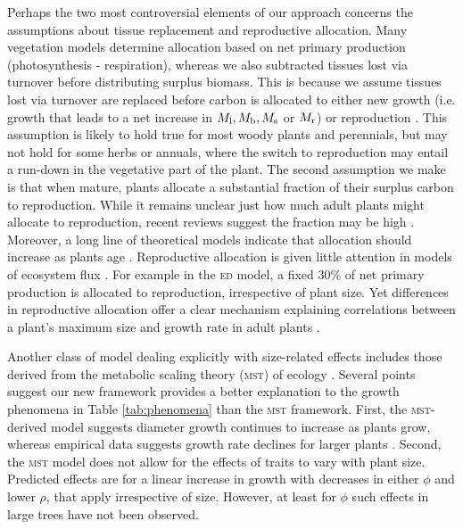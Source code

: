 \documentclass[9pt,twocolumn,twoside]{pnas-new}
\begin{document}
Perhaps the two most controversial elements of our approach concerns the assumptions about tissue replacement and reproductive allocation. Many vegetation models determine allocation based on net primary production (photosynthesis - respiration), whereas we also subtracted tissues lost via turnover before distributing surplus biomass. This is because we assume tissues lost via turnover are replaced before carbon is allocated to either new growth (i.e. growth that leads to a net increase in $M_{\rm l}, M_{\rm b}, M_{\rm s}$ or $M_{\rm r}$) or reproduction \citep{Thornley-2000}. This assumption is likely to hold true for most woody plants and perennials, but may not hold for some herbs or annuals, where the switch to reproduction may entail a run-down in the vegetative part of the plant. The second assumption we make is that when mature, plants allocate a substantial fraction of their surplus carbon to reproduction. While it remains unclear just how much adult plants might allocate to reproduction, recent reviews suggest the fraction may be high \citep{Thomas-2011, Wenk-2015}. Moreover, a long line of theoretical models indicate that allocation should increase as plants age \citep[reviewed by ][]{Wenk-2015}. Reproductive allocation is given little attention in models of ecosystem flux \citep[e.g.][]{Sitch-2008, DeKauwe-2014}. For example in the \textsc{ed} model, a fixed 30\% of net primary production is allocated to reproduction, irrespective of plant size. Yet differences in reproductive allocation offer a clear mechanism explaining correlations between a plant's maximum size and growth rate in adult plants \citep[e.g.][]{Wright-2010}.

Another class of model dealing explicitly with size-related effects includes those derived from the metabolic scaling theory (\textsc{mst}) of ecology \citep{Enquist-1999, Enquist-2007}. Several points suggest our new framework provides a better explanation to the growth phenomena in Table \ref{tab:phenomena} than the \textsc{mst} framework. First, the \textsc{mst}-derived model suggests diameter growth continues to increase as plants grow, whereas empirical data suggests growth rate declines for larger plants \citep{Canham-2004, Canham-2006, Herault-2011}. Second, the \textsc{mst} model does not allow for the effects of traits to vary with plant size. Predicted effects are for a linear increase in growth with decreases in either $\phi$ and lower $\rho$, that apply irrespective of size. However, at least for $\phi$ such effects in large trees have not been observed.
\end{document}
